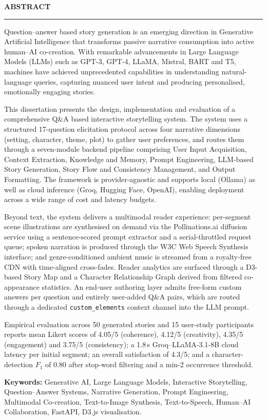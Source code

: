 \thispagestyle{empty}

\begin{center}
{\Large {\bf \uppercase{ABSTRACT}}}
\end{center}

\vspace{\baselineskip}
\hrule
\vspace{2\baselineskip}

\justifying
\setlength{\parskip}{0.6em}

Question--answer based story generation is an emerging direction in
Generative Artificial Intelligence that transforms passive narrative
consumption into active human--AI co-creation. With remarkable
advancements in Large Language Models (LLMs) such as GPT-3, GPT-4,
LLaMA, Mistral, BART and T5, machines have achieved unprecedented
capabilities in understanding natural-language queries, capturing
nuanced user intent and producing personalised, emotionally engaging
stories.

This dissertation presents the design, implementation and evaluation
of a comprehensive Q\&A based interactive storytelling system. The
system uses a structured 17-question elicitation protocol across four
narrative dimensions (setting, character, theme, plot) to gather user
preferences, and routes them through a seven-module backend pipeline
comprising User Input Acquisition, Context Extraction, Knowledge and
Memory, Prompt Engineering, LLM-based Story Generation, Story Flow
and Consistency Management, and Output Formatting. The framework is
provider-agnostic and supports local (Ollama) as well as cloud
inference (Groq, Hugging Face, OpenAI), enabling deployment across a
wide range of cost and latency budgets.

Beyond text, the system delivers a multimodal reader experience:
per-segment scene illustrations are synthesised on demand via the
Pollinations.ai diffusion service using a sentence-scored prompt
extractor and a serial-throttled request queue; spoken narration is
produced through the W3C Web Speech Synthesis interface; and
genre-conditioned ambient music is streamed from a royalty-free CDN
with time-aligned cross-fades. Reader analytics are surfaced through
a D3-based Story Map and a Character Relationship Graph derived from
filtered co-appearance statistics. An end-user authoring layer
admits free-form custom answers per question and entirely user-added
Q\&A pairs, which are routed through a dedicated
\texttt{custom\_elements} context channel into the LLM prompt.

Empirical evaluation across 50 generated stories and 15 user-study
participants reports mean Likert scores of 4.05/5 (coherence),
4.12/5 (creativity), 4.35/5 (engagement) and 3.75/5 (consistency); a
1.8\,s Groq--LLaMA-3.1-8B cloud latency per initial segment; an
overall satisfaction of 4.3/5; and a character-detection $F_1$ of
0.80 after stop-word filtering and a min-2 occurrence threshold.

\vspace{0.5\baselineskip}
{\large \bf{Keywords}: }
Generative AI, Large Language Models, Interactive Storytelling,
Question--Answer Systems, Narrative Generation, Prompt Engineering,
Multimodal Co-creation, Text-to-Image Synthesis, Text-to-Speech,
Human--AI Collaboration, FastAPI, D3.js visualisation.
